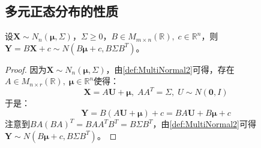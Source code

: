 \subsection{多元正态分布的性质}
\begin{theorem}\label{theo:MultiNormalLinearTransform}
	设$\mathbf{X}\sim N_n(\boldsymbol{\mu},\Sigma)$，$\Sigma\geqslant0$，$B\in M_{m\times n}(\mathbb{R}),\;c\in\mathbb{R}^{n}$，则$\mathbf{Y}=B\mathbf{X}+c\sim N(B\boldsymbol{\mu}+c,B\Sigma B^T)$。
\end{theorem}
\begin{proof}
	因为$\mathbf{X}\sim N_n(\boldsymbol{\mu},\Sigma)$，由\cref{def:MultiNormal2}可得，存在$A\in M_{n\times r}(\mathbb{R}),\;\boldsymbol{\mu}\in\mathbb{R}^{n}$使得：
	\begin{equation*}
		\mathbf{X}=A\mathbf{U}+\boldsymbol{\mu},\;AA^T=\Sigma,\;U\sim N(\mathbf{0},I)
	\end{equation*}
	于是：
	\begin{equation*}
		\mathbf{Y}=B(A\mathbf{U}+\boldsymbol{\mu})+c=BA\mathbf{U}+B\boldsymbol{\mu}+c
	\end{equation*}
	注意到$BA(BA)^T=BAA^TB^T=B\Sigma B^T$，由\cref{def:MultiNormal2}可得$\mathbf{Y}\sim N(B\boldsymbol{\mu}+c,B\Sigma B^T)$。
\end{proof}
